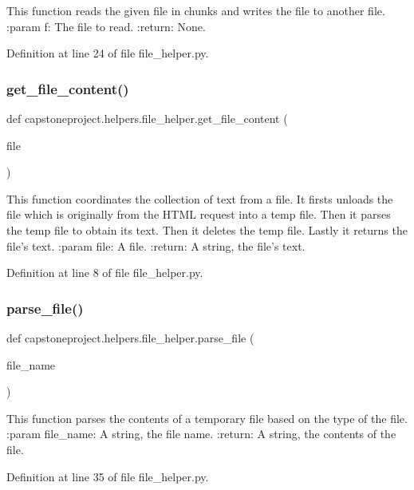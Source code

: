 \begin{DoxyVerb}This function reads the given file in chunks and writes the file to another file.
:param f: The file to read.
:return: None.
\end{DoxyVerb}
 

Definition at line 24 of file file\+\_\+helper.\+py.

\mbox{\label{namespacecapstoneproject_1_1helpers_1_1file__helper_aba707ec8463cda5c19569a87d3becb36}} 
\subsubsection{\texorpdfstring{get\+\_\+file\+\_\+content()}{get\_file\_content()}}
{\footnotesize\ttfamily def capstoneproject.\+helpers.\+file\+\_\+helper.\+get\+\_\+file\+\_\+content (\begin{DoxyParamCaption}\item[{}]{file }\end{DoxyParamCaption})}

\begin{DoxyVerb}This function coordinates the collection of text from a file.
It firsts unloads the file which is originally from the HTML request into a temp file.
Then it parses the temp file to obtain its text.
Then it deletes the temp file.
Lastly it returns the file's text.
:param file: A file.
:return: A string, the file's text.
\end{DoxyVerb}
 

Definition at line 8 of file file\+\_\+helper.\+py.

\mbox{\label{namespacecapstoneproject_1_1helpers_1_1file__helper_a918cbaf95eec5aae9430d616de3ed087}} 
\subsubsection{\texorpdfstring{parse\+\_\+file()}{parse\_file()}}
{\footnotesize\ttfamily def capstoneproject.\+helpers.\+file\+\_\+helper.\+parse\+\_\+file (\begin{DoxyParamCaption}\item[{}]{file\+\_\+name }\end{DoxyParamCaption})}

\begin{DoxyVerb}This function parses the contents of a temporary file based on the type of the file.
:param file_name: A string, the file name.
:return: A string, the contents of the file.
\end{DoxyVerb}
 

Definition at line 35 of file file\+\_\+helper.\+py.

